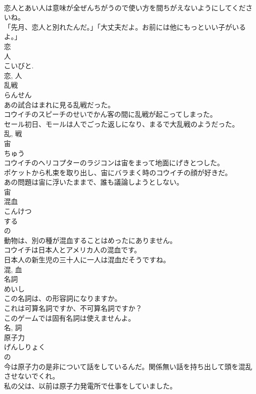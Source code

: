 \documentclass[8pt]{extreport}
\begin{document}
\begin{CJK}{UTF8}{min}
\\	恋人とあい人は意味が全ぜんちがうので使い方を間ちがえないようにしてくださいね。	
\\	「先月、恋人と別れたんだ。」「大丈夫だよ。お前には他にもっといい子がいるよ。」	
\\	恋 
\\	人 
\\	こいびと. 
\\	恋, 人	
\\	乱戦	
\\	らんせん	
\\	あの試合はまれに見る乱戦だった。	
\\	コウイチのスピーチのせいでかん客の間に乱戦が起こってしまった。	
\\	セール初日、モールは人でごった返しになり、まるで大乱戦のようだった。	
\\	乱, 戦	
\\	宙	
\\	ちゅう	
\\	コウイチのヘリコプターのラジコンは宙をまって地面にげきとつした。	
\\	ポケットから札束を取り出し、宙にバラまく時のコウイチの顔が好きだ。	
\\	あの問題は宙に浮いたままで、誰も議論しようとしない。	
\\	宙	
\\	混血	
\\	こんけつ	
\\	する 
\\	の 
\\	動物は、別の種が混血することはめったにありません。	
\\	コウイチは日本人とアメリカ人の混血です。	
\\	日本人の新生児の三十人に一人は混血だそうですね。	
\\	混, 血	
\\	名詞	
\\	めいし	
\\	この名詞は、の形容詞になりますか。	
\\	これは可算名詞ですか、不可算名詞ですか？	
\\	このゲームでは固有名詞は使えませんよ。	
\\	名, 詞	
\\	原子力	
\\	げんしりょく	
\\	の 
\\	今は原子力の是非について話をしているんだ。関係無い話を持ち出して頭を混乱させないでくれ。	
\\	私の父は、以前は原子力発電所で仕事をしていました。	

\end{CJK}
\end{document}
